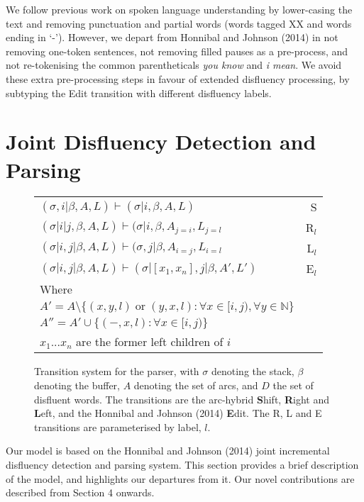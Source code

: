 \documentclass[11pt,letterpaper]{article}
\begin{document}
We follow previous work on spoken language understanding by lower-casing the text
and removing punctuation and partial words (words tagged XX and words ending in
`-').  However, we depart from Honnibal and Johnson (2014) in not removing one-token
sentences, not removing filled pauses as a pre-process, and not
re-tokenising the common parentheticals \emph{you know} and \emph{i mean}.
We avoid these extra pre-processing steps in favour of extended disfluency processing,
by subtyping the Edit transition with different disfluency labels.

\section{Joint Disfluency Detection and Parsing}

\begin{figure}
    \centering
    \small
    \begin{tabular}{lr}
        \hline
        $(\sigma, i | \beta, A, L) \vdash (\sigma | i, \beta, A, L)$ & S \\
        $(\sigma | i | j, \beta, A, L) \vdash (\sigma | i, \beta, A_{j=i}, L_{j=l}$ & R$_l$ \\ 
        $(\sigma | i, j | \beta, A, L) \vdash (\sigma, j | \beta, A_{i=j}, L_{i=l}$ & L$_l$ \\
        $(\sigma | i, j | \beta, A, L) \vdash (\sigma | [x_1, x_n], j | \beta, A', L')$ & E$_l$ \\
        Where \\
        $A' = A \setminus \{(x, y, l) \;\mathrm{or}\; (y, x, l) : \forall x \in [i, j), \forall y \in \mathbb{N} \}$ \\
            $A'' = A' \cup \{(-, x, l) : \forall x \in [i, j) \} $ \\
        $x_1...x_n$ are the former left children of $i$ \\
        \hline
\end{tabular}
\caption{\small Transition system for the parser, with $\sigma$ denoting the
    stack, $\beta$ denoting the buffer, $A$ denoting the set of arcs, and $D$ the
    set of disfluent words.  The transitions are the arc-hybrid \textbf{S}hift,
    \textbf{R}ight and \textbf{L}eft, and the Honnibal and Johnson (2014) \textbf{E}dit.
    The R, L and E transitions are parameterised by label, $l$.
\label{fig:trans}}
\vspace*{-3em}
\end{figure}
Our model is based on the Honnibal and Johnson (2014) joint incremental disfluency
detection and parsing system.  This section provides a brief description of
the model, and highlights our departures from it.
Our novel contributions are described from Section 4 onwards.
%
\end{document}
